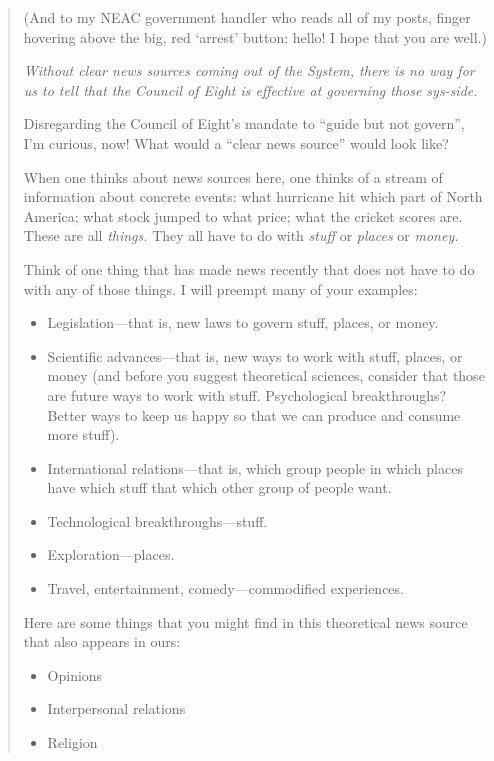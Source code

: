 \begin{quote}
(And to my NEAC government handler who reads all of my posts, finger hovering above the big, red `arrest' button: hello! I hope that you are well.)

\emph{Without clear news sources coming out of the System, there is no way for us to tell that the Council of Eight is effective at governing those sys-side.}

Disregarding the Council of Eight's mandate to ``guide but not govern'', I'm curious, now! What would a ``clear news source'' would look like?

When one thinks about news sources here, one thinks of a stream of information about concrete events: what hurricane hit which part of North America; what stock jumped to what price; what the cricket scores are. These are all \emph{things.} They all have to do with \emph{stuff} or \emph{places} or \emph{money.}

Think of one thing that has made news recently that does not have to do with any of those things. I will preempt many of your examples:

\begin{itemize}
\tightlist
\item
  Legislation---that is, new laws to govern stuff, places, or money.
\item
  Scientific advances---that is, new ways to work with stuff, places, or money (and before you suggest theoretical sciences, consider that those are future ways to work with stuff. Psychological breakthroughs? Better ways to keep us happy so that we can produce and consume more stuff).
\item
  International relations---that is, which group people in which places have which stuff that which other group of people want.
\item
  Technological breakthroughs---stuff.
\item
  Exploration---places.
\item
  Travel, entertainment, comedy---commodified experiences.
\end{itemize}

Here are some things that you might find in this theoretical news source that also appears in ours:

\begin{itemize}
\tightlist
\item
  Opinions
\item
  Interpersonal relations
\item
  Religion
\end{itemize}


\end{quote}
